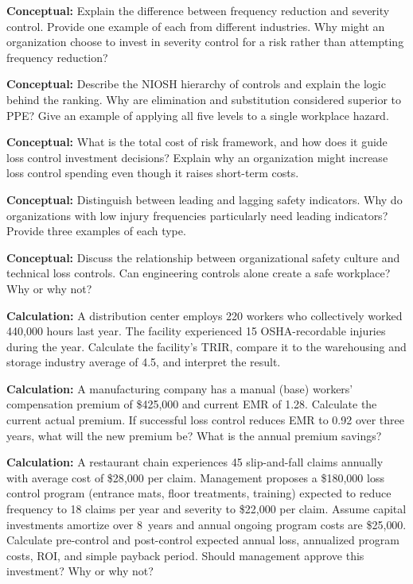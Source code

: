 \documentclass[11pt,openany]{book}
\begin{document}
\begin{discussionquestions}
\item \textbf{Conceptual:} Explain the difference between frequency reduction
  and severity control. Provide one example of each from different industries.
  Why might an organization choose to invest in severity control for a risk
  rather than attempting frequency reduction?

\item \textbf{Conceptual:} Describe the NIOSH hierarchy of controls and
  explain the logic behind the ranking. Why are elimination and substitution
  considered superior to PPE? Give an example of applying all five levels to a
  single workplace hazard.

\item \textbf{Conceptual:} What is the total cost of risk framework, and how
  does it guide loss control investment decisions? Explain why an organization
  might increase loss control spending even though it raises short-term costs.

\item \textbf{Conceptual:} Distinguish between leading and lagging safety
  indicators. Why do organizations with low injury frequencies particularly
  need leading indicators? Provide three examples of each type.

\item \textbf{Conceptual:} Discuss the relationship between organizational
  safety culture and technical loss controls. Can engineering controls alone
  create a safe workplace? Why or why not?

\item \textbf{Calculation:} A distribution center employs 220 workers who
  collectively worked 440{,}000 hours last year. The facility experienced 15
  OSHA-recordable injuries during the year. Calculate the facility's TRIR,
  compare it to the warehousing and storage industry average of 4.5, and
  interpret the result.

\item \textbf{Calculation:} A manufacturing company has a manual (base)
  workers' compensation premium of \$425{,}000 and current EMR of 1.28.
  Calculate the current actual premium. If successful loss control reduces EMR
  to 0.92 over three years, what will the new premium be? What is the annual
  premium savings?

\item \textbf{Calculation:} A restaurant chain experiences 45 slip-and-fall
  claims annually with average cost of \$28{,}000 per claim. Management
  proposes a \$180{,}000 loss control program (entrance mats, floor
  treatments, training) expected to reduce frequency to 18 claims per year and
  severity to \$22{,}000 per claim. Assume capital investments amortize over
  8~years and annual ongoing program costs are \$25{,}000. Calculate
  pre-control and post-control expected annual loss, annualized program costs,
  ROI, and simple payback period. Should management approve this investment?
  Why or why not?


\end{discussionquestions}
\end{document}
